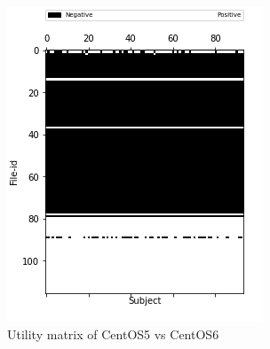 \documentclass[10pt, conference, compsocconf]{IEEEtran}
\begin{document}
\begin{figure}[h!]
  \centering
  \begin{subfigure}[b]{0.5\linewidth}
	\includegraphics[width=\columnwidth]{figures/utility_5vs6_PFS}
  \caption{Utility matrix of CentOS5 vs CentOS6}
  \end{subfigure}
  \begin{subfigure}[b]{0.5\linewidth}

\end{subfigure}
\end{figure}
\end{document}

